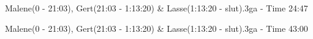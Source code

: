 \begin{thebibliography}{9}

	Malene(0 - 21:03), Gert(21:03 - 1:13:20) \& Lasse(1:13:20 - slut).3ga - Time 24:47

	Malene(0 - 21:03), Gert(21:03 - 1:13:20) \& Lasse(1:13:20 - slut).3ga - Time 43:00

\end{thebibliography}